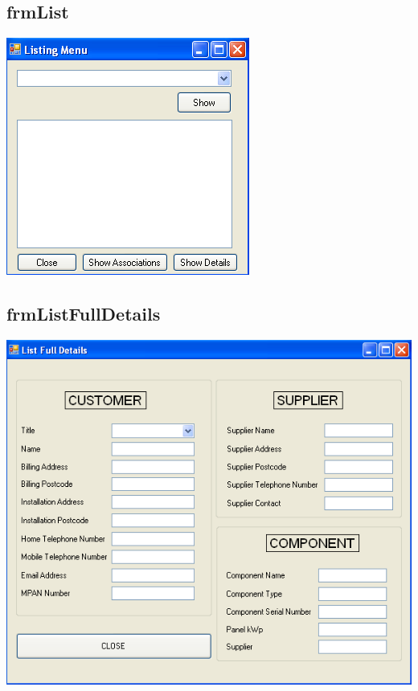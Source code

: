 \subsection{frmList}
	\includegraphics[scale=0.5]{frmList_scrot}
	
	
\subsection{frmListFullDetails}
	\includegraphics[scale=0.5]{frmListFullDetails_scrot}
	
	
